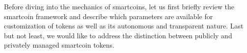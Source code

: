 Before diving into the mechanics of smartcoins, let us first briefly
review the smartcoin framework and describe which parameters are
available for customization of tokens as well as its autonomous and
transparent nature. Last but not least, we would like to address the
distinction between publicly and privately managed smartcoin tokens.
